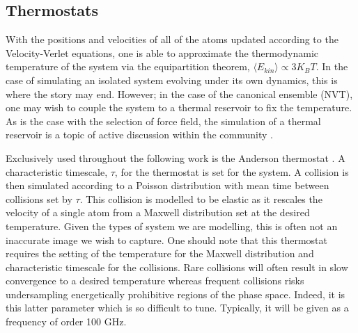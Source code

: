 \subsection{Thermostats}

With the positions and velocities of all of the atoms updated according to the Velocity-Verlet equations, one is able to approximate the thermodynamic temperature of the system via the equipartition theorem, $\langle E_{kin}\rangle \propto 3K_{B}T$. In the case of simulating an isolated system evolving under its own dynamics, this is where the story may end. However; in the case of the canonical ensemble (NVT), one may wish to couple the system to a thermal reservoir to fix the temperature. As is the case with the selection of force field, the simulation of a thermal reservoir is a topic of active discussion within the community \cite{doi:10.1063/1.4792202,doi:10.1080/08927022.2021.1907382,Hu_2022,KE2022120116}. 

Exclusively used throughout the following work is the Anderson thermostat \cite{doi:10.1063/1.439486,doi:10.1063/1.2198824}. A characteristic timescale, $\tau$, for the thermostat is set for the system. A collision is then simulated according to a Poisson distribution with mean time between collisions set by $\tau$. This collision is modelled to be elastic as it rescales the velocity of a single atom from a Maxwell distribution set at the desired temperature. Given the types of system we are modelling, this is often not an inaccurate image we wish to capture. One should note that this thermostat requires the setting of the temperature for the Maxwell distribution and characteristic timescale for the collisions. Rare collisions will often result in slow convergence to a desired temperature whereas frequent collisions risks undersampling energetically prohibitive regions of the phase space. Indeed, it is this latter parameter which is so difficult to tune. Typically, it will be given as a frequency of order 100 GHz.

